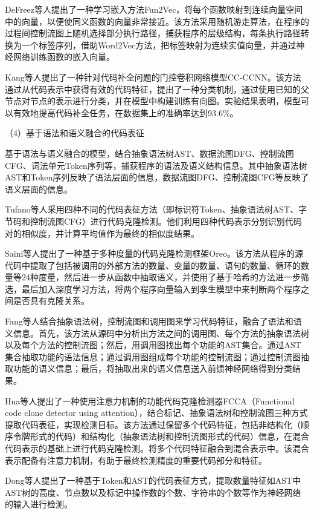 DeFreez等人\cite{10.1145/3236024.3236059}提出了一种学习嵌入方法Fun2Vec，将每个函数映射到连续向量空间中的向量，以便使同义函数的向量非常接近。该方法采用随机游走算法，在程序的过程间控制流图上随机选择部分执行路径，捕获程序的层级结构，每条执行路径转换为一个标签序列，借助Word2Vec方法，把标签映射为连续实值向量，并通过神经网络训练函数的嵌入向量。

Kang等人\cite{Yang2021AGS}提出了一种针对代码补全问题的门控卷积网络模型CC-CCNN。该方法通过从代码表示中获得有效的代码特征，提出了一种分类机制，通过使用已知的父节点对节点的表示进行分类，并在模型中构建训练有向图。实验结果表明，模型可以有效地提高代码补全任务，在数据集上的准确率达到93.6\%。


（4）基于语法和语义融合的代码表征

基于语法与语义融合的模型，结合抽象语法树AST、数据流图DFG、控制流图CFG、词法单元Token序列等，捕获程序的语法及语义结构信息。其中抽象语法树AST和Token序列反映了语法层面的信息，数据流图DFG、控制流图CFG等反映了语义层面的信息。

Tufano等人\cite{Tufano2018DeepLS}采用四种不同的代码表征方法（即标识符Token、抽象语法树AST、字节码和控制流图CFG）进行代码克隆检测。他们利用四种代码表示分别识别代码对的相似度，并计算平均值作为最终的相似度结果。

Saini等人\cite{10.1145/3236024.3236026}提出了一种基于多种度量的代码克隆检测框架Oreo。该方法从程序的源代码中提取了包括被调用的外部方法的数量、变量的数量、语句的数量、循环的数量等24种度量，然后进一步从函数中抽取语义，并使用了基于哈希的方法进一步筛选，最后加入深度学习方法，将两个程序向量输入到孪生模型中来判断两个程序之间是否具有克隆关系。

Fang等人\cite{Fang2020FunctionalCC}结合抽象语法树，控制流图和调用图来学习代码特征，融合了语法和语义信息。首先，该方法从源码中分析出方法之间的调用图、每个方法的抽象语法树以及每个方法的控制流图；然后，用调用图找出每个功能的AST集合。通过AST集合抽取功能的语法信息；通过调用图组成每个功能的控制流图；通过控制流图抽取功能的语义信息；最后，将抽取出来的语义信息送入前馈神经网络得到分类结果。

Hua等人\cite{Hua2020FCCAHC}提出了一种使用注意力机制的功能代码克隆检测器FCCA（Functional code clone detector using attention），结合标记、抽象语法树和控制流图三种方式提取代码表征，实现检测目标。该方法通过保留多个代码特征，包括非结构化（顺序令牌形式的代码）和结构化（抽象语法树和控制流图形式的代码）信息，在混合代码表示的基础上进行代码克隆检测。将多个代码特征融合到混合表示中。该混合表示配备有注意力机制，有助于最终检测精度的重要代码部分和特征。

Dong等人\cite{9148302}提出了一种基于Token和AST的代码表征方式，提取数量特征如AST中AST树的高度、节点数以及标记中操作数的个数、字符串的个数等作为神经网络的输入进行检测。

